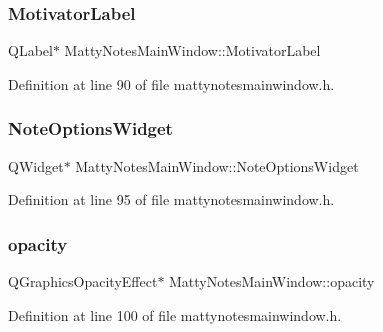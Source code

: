 \subsubsection{\texorpdfstring{Motivator\+Label}{MotivatorLabel}}
{\footnotesize\ttfamily Q\+Label$\ast$ Matty\+Notes\+Main\+Window\+::\+Motivator\+Label\hspace{0.3cm}{\ttfamily [private]}}



Definition at line 90 of file mattynotesmainwindow.\+h.

\hypertarget{classMattyNotesMainWindow_aa98524af7077eef16ba0529e5175f994}{}\label{classMattyNotesMainWindow_aa98524af7077eef16ba0529e5175f994} 
\subsubsection{\texorpdfstring{Note\+Options\+Widget}{NoteOptionsWidget}}
{\footnotesize\ttfamily Q\+Widget$\ast$ Matty\+Notes\+Main\+Window\+::\+Note\+Options\+Widget\hspace{0.3cm}{\ttfamily [private]}}



Definition at line 95 of file mattynotesmainwindow.\+h.

\hypertarget{classMattyNotesMainWindow_af8ed120785fb64d9df0c6682fcdb4977}{}\label{classMattyNotesMainWindow_af8ed120785fb64d9df0c6682fcdb4977} 
\subsubsection{\texorpdfstring{opacity}{opacity}}
{\footnotesize\ttfamily Q\+Graphics\+Opacity\+Effect$\ast$ Matty\+Notes\+Main\+Window\+::opacity\hspace{0.3cm}{\ttfamily [private]}}



Definition at line 100 of file mattynotesmainwindow.\+h.

\hypertarget{classMattyNotesMainWindow_a5a9a3eb38d87523446ea1d765e78048d}{}\label{classMattyNotesMainWindow_a5a9a3eb38d87523446ea1d765e78048d} 
